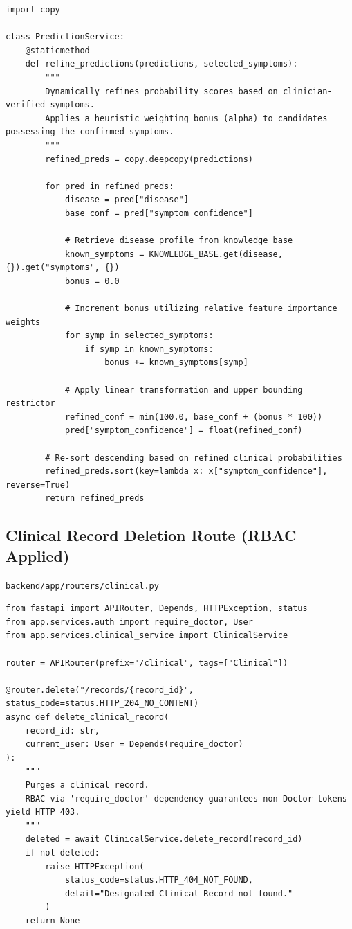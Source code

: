 \documentclass[a4paper,12pt]{report}
\begin{document}
\begin{lstlisting}[caption={Python implementation of the Disease Probability Refinement Loop}]
import copy

class PredictionService:
    @staticmethod
    def refine_predictions(predictions, selected_symptoms):
        """
        Dynamically refines probability scores based on clinician-verified symptoms.
        Applies a heuristic weighting bonus (alpha) to candidates possessing the confirmed symptoms.
        """
        refined_preds = copy.deepcopy(predictions)
        
        for pred in refined_preds:
            disease = pred["disease"]
            base_conf = pred["symptom_confidence"]
            
            # Retrieve disease profile from knowledge base
            known_symptoms = KNOWLEDGE_BASE.get(disease, {}).get("symptoms", {})
            bonus = 0.0
            
            # Increment bonus utilizing relative feature importance weights
            for symp in selected_symptoms:
                if symp in known_symptoms:
                    bonus += known_symptoms[symp]
            
            # Apply linear transformation and upper bounding restrictor
            refined_conf = min(100.0, base_conf + (bonus * 100))
            pred["symptom_confidence"] = float(refined_conf)
            
        # Re-sort descending based on refined clinical probabilities
        refined_preds.sort(key=lambda x: x["symptom_confidence"], reverse=True)
        return refined_preds
\end{lstlisting}

\subsection*{Clinical Record Deletion Route (RBAC Applied)}
\texttt{backend/app/routers/clinical.py}

\begin{lstlisting}[caption={FastAPI Router defining role-segregated HTTP DELETE behavior}]
from fastapi import APIRouter, Depends, HTTPException, status
from app.services.auth import require_doctor, User
from app.services.clinical_service import ClinicalService

router = APIRouter(prefix="/clinical", tags=["Clinical"])

@router.delete("/records/{record_id}", status_code=status.HTTP_204_NO_CONTENT)
async def delete_clinical_record(
    record_id: str,
    current_user: User = Depends(require_doctor)
):
    """
    Purges a clinical record. 
    RBAC via 'require_doctor' dependency guarantees non-Doctor tokens yield HTTP 403.
    """
    deleted = await ClinicalService.delete_record(record_id)
    if not deleted:
        raise HTTPException(
            status_code=status.HTTP_404_NOT_FOUND, 
            detail="Designated Clinical Record not found."
        )
    return None
\end{lstlisting}
\end{document}
